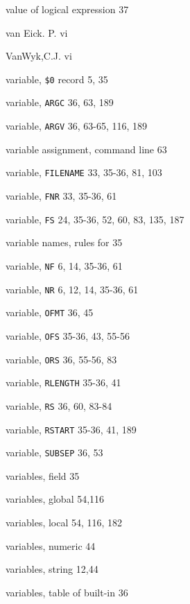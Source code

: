 \begin{multicols}{3}
\hangindent=3pc  value of logical expression 37

\hangindent=3pc  van Eick. P. vi

\hangindent=3pc  VanWyk,C.J. vi

\hangindent=3pc  variable, \verb'$0' record 5, 35

\hangindent=3pc  variable, \verb'ARGC' 36, 63, 189

\hangindent=3pc  variable, \verb'ARGV' 36, 63-65, 116, 189

\hangindent=3pc  variable assignment, command line 63

\hangindent=3pc  variable, \verb'FILENAME' 33, 35-36, 81, 103

\hangindent=3pc  variable, \verb'FNR' 33, 35-36, 61

\hangindent=3pc  variable, \verb'FS' 24, 35-36, 52, 60, 83, 135, 187

\hangindent=3pc  variable names, rules for 35

\hangindent=3pc  variable, \verb'NF' 6, 14, 35-36, 61

\hangindent=3pc  variable, \verb'NR' 6, 12, 14, 35-36, 61

\hangindent=3pc  variable, \verb'OFMT' 36, 45

\hangindent=3pc  variable, \verb'OFS' 35-36, 43, 55-56

\hangindent=3pc  variable, \verb'ORS' 36, 55-56, 83

\hangindent=3pc  variable, \verb'RLENGTH' 35-36, 41

\hangindent=3pc  variable, \verb'RS' 36, 60, 83-84

\hangindent=3pc  variable, \verb'RSTART' 35-36, 41, 189

\hangindent=3pc  variable, \verb'SUBSEP' 36, 53

\hangindent=3pc  variables, field 35

\hangindent=3pc  variables, global 54,116

\hangindent=3pc  variables, local 54, 116, 182

\hangindent=3pc  variables, numeric 44

\hangindent=3pc  variables, string 12,44

\hangindent=3pc  variables, table of built-in 36


\end{multicols}
